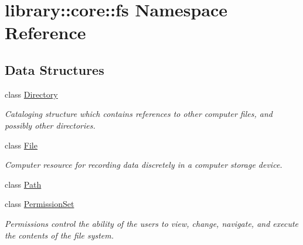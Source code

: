 \hypertarget{namespacelibrary_1_1core_1_1fs}{}\section{library\+:\+:core\+:\+:fs Namespace Reference}
\label{namespacelibrary_1_1core_1_1fs}
\subsection*{Data Structures}
\begin{DoxyCompactItemize}
\item 
class \hyperlink{classlibrary_1_1core_1_1fs_1_1Directory}{Directory}
\begin{DoxyCompactList}\small\item\em Cataloging structure which contains references to other computer files, and possibly other directories. \end{DoxyCompactList}\item 
class \hyperlink{classlibrary_1_1core_1_1fs_1_1File}{File}
\begin{DoxyCompactList}\small\item\em Computer resource for recording data discretely in a computer storage device. \end{DoxyCompactList}\item 
class \hyperlink{classlibrary_1_1core_1_1fs_1_1Path}{Path}
\item 
class \hyperlink{classlibrary_1_1core_1_1fs_1_1PermissionSet}{Permission\+Set}
\begin{DoxyCompactList}\small\item\em Permissions control the ability of the users to view, change, navigate, and execute the contents of the file system. \end{DoxyCompactList}\end{DoxyCompactItemize}
